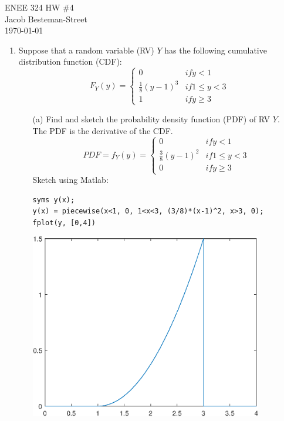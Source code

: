 \documentclass{report}
\begin{document}
ENEE 324 HW \#4 \\
Jacob Besteman-Street \\
\today \\
\begin{enumerate}
\item Suppose that a random variable (RV) $Y$ has the following cumulative distribution function (CDF): \\
$$ F_Y(y) = \left. \begin{cases}
0 & if y < 1 \\
\frac{1}{8}(y-1)^3 & if 1 \leq y < 3 \\
1 & if y \geq 3
\end{cases} \right.$$
\begin{itemize}
  \item[(a)] Find and sketch the probability density function (PDF) of RV $Y$. \\
  The PDF is the derivative of the CDF.
  $$ PDF = f_Y(y) = \left. \begin{cases}
  0 & if y < 1 \\
  \frac{3}{8}(y-1)^2 & if 1 \leq y < 3 \\
  0 & if y \geq 3
  \end{cases} \right.$$
Sketch using Matlab:
\begin{verbatim}
syms y(x);
y(x) = piecewise(x<1, 0, 1<x<3, (3/8)*(x-1)^2, x>3, 0);
fplot(y, [0,4])
\end{verbatim}
\includegraphics [width=4in]{enee324hw4_01.eps}


\end{itemize}
\end{enumerate}
\end{document}
